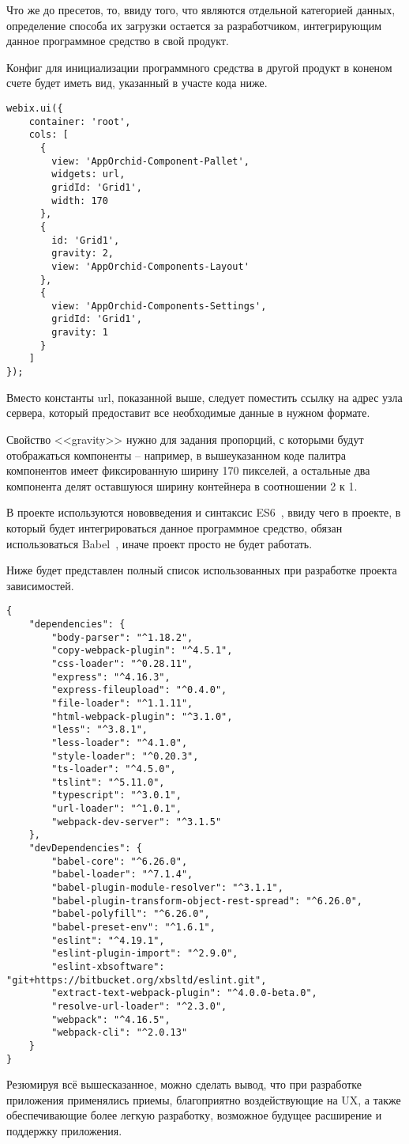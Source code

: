 Что же до пресетов, то, ввиду того, что являются отдельной категорией данных, определение способа их загрузки остается за разработчиком, интегрирующим данное программное средство в свой продукт.

Конфиг для инициализации программного средства в другой продукт в коненом счете будет иметь вид, указанный в участе кода ниже.

\begin{lstlisting}
webix.ui({
	container: 'root',
	cols: [
	  {
	    view: 'AppOrchid-Component-Pallet',
	    widgets: url,
	    gridId: 'Grid1',
	    width: 170
	  },
	  {
	    id: 'Grid1',
	    gravity: 2,
	    view: 'AppOrchid-Components-Layout'
	  },
	  {
	    view: 'AppOrchid-Components-Settings',
	    gridId: 'Grid1',
	    gravity: 1
	  }
	]
});
\end{lstlisting}

Вместо константы url, показанной выше, следует поместить ссылку на адрес узла сервера, который предоставит все необходимые данные в нужном формате.

Свойство <<gravity>> нужно для задания пропорций, с которыми будут отображаться компоненты -- например, в вышеуказанном коде палитра компонентов имеет фиксированную ширину 170 пикселей, а остальные два компонента делят оставшуюся ширину контейнера в соотношении 2 к 1.

В проекте используются нововведения и синтаксис ES6~\cite{ecma_additional}, ввиду чего в проекте, в который будет интегрироваться данное программное средство, обязан использоваться Babel~\cite{babel}, иначе проект просто не будет работать. 

Ниже будет представлен полный список использованных при разработке проекта зависимостей. 

\begin{lstlisting}
{
	"dependencies": {
		"body-parser": "^1.18.2",
		"copy-webpack-plugin": "^4.5.1",
		"css-loader": "^0.28.11",
		"express": "^4.16.3",
		"express-fileupload": "^0.4.0",
		"file-loader": "^1.1.11",
		"html-webpack-plugin": "^3.1.0",
		"less": "^3.8.1",
		"less-loader": "^4.1.0",
		"style-loader": "^0.20.3",
		"ts-loader": "^4.5.0",
		"tslint": "^5.11.0",
		"typescript": "^3.0.1",
		"url-loader": "^1.0.1",
		"webpack-dev-server": "^3.1.5"
	},
	"devDependencies": {
		"babel-core": "^6.26.0",
		"babel-loader": "^7.1.4",
		"babel-plugin-module-resolver": "^3.1.1",
		"babel-plugin-transform-object-rest-spread": "^6.26.0",
		"babel-polyfill": "^6.26.0",
		"babel-preset-env": "^1.6.1",
		"eslint": "^4.19.1",
		"eslint-plugin-import": "^2.9.0",
		"eslint-xbsoftware": "git+https://bitbucket.org/xbsltd/eslint.git",
		"extract-text-webpack-plugin": "^4.0.0-beta.0",
		"resolve-url-loader": "^2.3.0",
		"webpack": "^4.16.5",
		"webpack-cli": "^2.0.13"
	}
}
\end{lstlisting}

Резюмируя всё вышесказанное, можно сделать вывод, что при разработке приложения применялись приемы, благоприятно воздействующие на UX, а также обеспечивающие более легкую разработку, возможное будущее расширение и поддержку приложения.